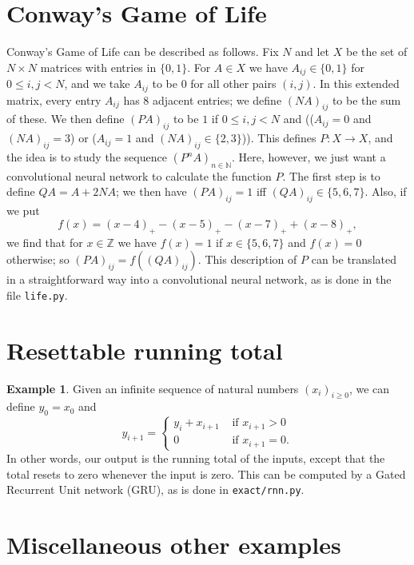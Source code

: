\documentclass{amsart}
\newcommand{\N}         {{\mathbb{N}}}
\newcommand{\Z}         {{\mathbb{Z}}}
\newcommand{\tm}        {\times}
\renewcommand{\:}{\colon}
\theoremstyle{definition}
\newtheorem{example}[theorem]{Example}
\begin{document}
\section{Conway's Game of Life}

Conway's Game of Life can be described as follows.  Fix $N$ and let
$X$ be the set of $N\tm N$ matrices with entries in $\{0,1\}$.  For
$A\in X$ we have $A_{ij}\in\{0,1\}$ for $0\leq i,j<N$, and we take
$A_{ij}$ to be $0$ for all other pairs $(i,j)$.  In this extended
matrix, every entry $A_{ij}$ has $8$ adjacent entries; we define
$(NA)_{ij}$ to be the sum of these.  We then define $(PA)_{ij}$ to be
$1$ if $0\leq i,j<N$ and (($A_{ij}=0$ and $(NA)_{ij}=3$) or  
($A_{ij}=1$ and $(NA)_{ij}\in\{2,3\}$)).  This defines $P\:X\to X$,
and the idea is to study the sequence $(P^nA)_{n\in\N}$.  Here,
however, we just want a convolutional neural network to calculate the
function $P$.  The first step is to define $QA=A+2NA$; we then have
$(PA)_{ij}=1$ iff $(QA)_{ij}\in\{5,6,7\}$.  Also, if we put 
\[ f(x)=(x-4)_+ - (x-5)_+ - (x-7)_+ + (x-8)_+,\]
we find that for $x\in\Z$ we have $f(x)=1$ if $x\in\{5,6,7\}$ and
$f(x)=0$ otherwise; so $(PA)_{ij}=f((QA)_{ij})$.  This description of
$P$ can be translated in a straightforward way into a convolutional
neural network, as is done in the file \texttt{life.py}.

\section{Resettable running total}

\begin{example}\label{eg-running}
 Given an infinite sequence of natural numbers $(x_i)_{i\geq 0}$, we
 can define $y_0=x_0$ and 
 \[ y_{i+1} = \begin{cases}
     y_i+x_{i+1} & \text{ if } x_{i+1} > 0 \\
     0 & \text{ if } x_{i+1} = 0.
    \end{cases}
 \]
 In other words, our output is the running total of the inputs, except
 that the total resets to zero whenever the input is zero.  This can
 be computed by a Gated Recurrent Unit network (GRU), as is done in
 \texttt{exact/rnn.py}. 
\end{example}

\section{Miscellaneous other examples}
\end{document}
